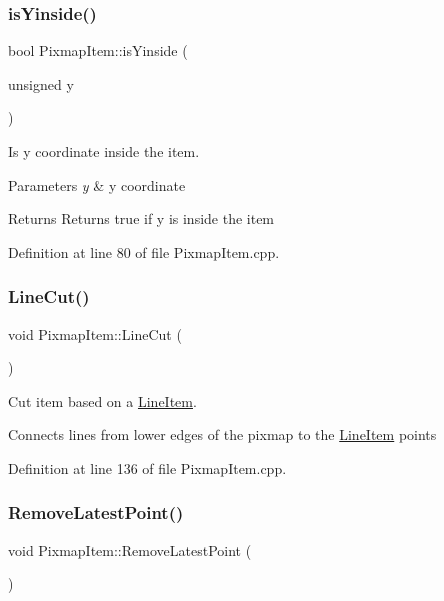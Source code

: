 \subsubsection{\texorpdfstring{is\+Yinside()}{isYinside()}}
{\footnotesize\ttfamily bool Pixmap\+Item\+::is\+Yinside (\begin{DoxyParamCaption}\item[{unsigned}]{y }\end{DoxyParamCaption})}



Is y coordinate inside the item. 


\begin{DoxyParams}{Parameters}
{\em y} & y coordinate \\
\hline
\end{DoxyParams}
\begin{DoxyReturn}{Returns}
Returns true if y is inside the item 
\end{DoxyReturn}


Definition at line 80 of file Pixmap\+Item.\+cpp.

\mbox{\label{classPixmapItem_ab71710e3b66024a62fe56a43e60141b3}} 
\subsubsection{\texorpdfstring{Line\+Cut()}{LineCut()}}
{\footnotesize\ttfamily void Pixmap\+Item\+::\+Line\+Cut (\begin{DoxyParamCaption}{ }\end{DoxyParamCaption})}



Cut item based on a \mbox{\hyperlink{classLineItem}{Line\+Item}}. 

Connects lines from lower edges of the pixmap to the \mbox{\hyperlink{classLineItem}{Line\+Item}} points 

Definition at line 136 of file Pixmap\+Item.\+cpp.

\mbox{\label{classPixmapItem_ae2e67a7b69ef10dc613e14c1d3c1a327}} 
\subsubsection{\texorpdfstring{Remove\+Latest\+Point()}{RemoveLatestPoint()}}
{\footnotesize\ttfamily void Pixmap\+Item\+::\+Remove\+Latest\+Point (\begin{DoxyParamCaption}{ }\end{DoxyParamCaption})}



